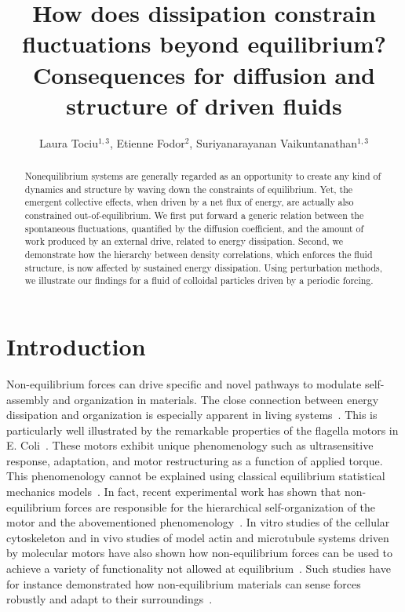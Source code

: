 \documentclass[pre,amsmath,preprintnumbers,10pt,article,notitlepage,twocolumn]{revtex4-1}
\begin{document}
\title{How does dissipation constrain fluctuations beyond equilibrium? Consequences for diffusion and structure of driven fluids}
\author{Laura Tociu$^{1,3}$, Etienne Fodor$^{2}$, Suriyanarayanan Vaikuntanathan$^{1,3}$} 
\begin{abstract}
Nonequilibrium systems are generally regarded as an opportunity to create any kind of dynamics and structure by waving down the constraints of equilibrium. Yet, the emergent collective effects, when driven by a net flux of energy, are actually also constrained out-of-equilibrium. We first put forward a generic relation between the spontaneous fluctuations, quantified by the diffusion coefficient, and the amount of work produced by an external drive, related to energy dissipation. Second, we demonstrate how the hierarchy between density correlations, which enforces the fluid structure, is now affected by sustained energy dissipation. Using perturbation methods, we illustrate our findings for a fluid of colloidal particles driven by a periodic forcing.
\end{abstract}
\maketitle 

\section{Introduction}


Non-equilibrium forces can drive specific and novel pathways to modulate self-assembly and organization in materials. The close connection between energy dissipation and organization is especially apparent in living systems~\cite{Battle604}. This is particularly well illustrated by the remarkable properties of the flagella motors in E. Coli~\cite{Lele2013,Lan2012,Tu2017}. These motors exhibit unique phenomenology such as ultrasensitive response, adaptation, and motor restructuring as a function of applied torque. This phenomenology cannot be explained using classical equilibrium statistical mechanics models~\cite{Lan2012,Tu2017}. In fact, recent experimental work has shown that non-equilibrium forces are responsible for the hierarchical self-organization of the motor and the abovementioned phenomenology~\cite{Wang2017,Tu2017}. In vitro studies of the cellular cytoskeleton and in vivo studies of model actin and microtubule systems driven by molecular motors have also shown how non-equilibrium forces can be used to achieve a variety of functionality not allowed at equilibrium~\cite{Decamp2015,Ramaswamy2010,Sanchez2012}. Such studies have for instance demonstrated how non-equilibrium materials can sense forces robustly and adapt to their surroundings~\cite{Decamp2015}. 
\end{document}
